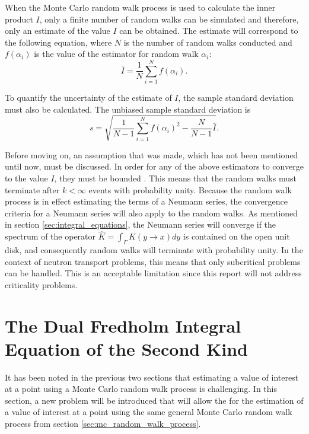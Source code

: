 When the Monte Carlo random walk process is used to calculate the inner product
$I$, only a finite number of random walks can be simulated and therefore, only 
an estimate of the value $I$ can be obtained. The estimate will
correspond to the following equation, where $N$ is the number of random walks
conducted and $f(\alpha_i)$ is the value of the estimator for random
walk $\alpha_i$:
\begin{equation}
  \bar{I} = \frac{1}{N} \sum_{i=1}^N f(\alpha_i).
  \label{eq:inner_product_estimate}
\end{equation}

To quantify the uncertainty of the estimate of $I$, the sample standard 
deviation must also be calculated. The unbiased sample standard deviation is 
\begin{equation}
  s = \sqrt{\frac{1}{N-1}\sum_{i=1}^N f(\alpha_i)^2 - \frac{N}{N-1}\bar{I}}.
  \label{eq:inner_product_stddev}
\end{equation}

Before moving on, an assumption that was made, which has not been mentioned
until now, must be discussed. In order for any of the above estimators to 
converge to the value $I$, they must be bounded \citep{spanier_monte_1969}. This
means that the random walks must terminate after $k < \infty$ events with 
probability unity. Because the random walk process is in effect estimating the
terms of a Neumann series, the convergence criteria for a Neumann series will
also apply to the random walks. As mentioned in section 
\ref{sec:integral_equations}, the Neumann series will converge if the spectrum
of the operator $\hat{K} = \int_{\Gamma} K(y \to x)dy$ is contained on the open
unit disk, and consequently random walks will terminate with probability unity.
In the context of neutron transport problems, this means that only subcritical 
problems can be handled. This is an acceptable limitation since this report 
will not address criticality problems.

\section{The Dual Fredholm Integral Equation of the Second Kind}
\label{sec:dual_problems}
It has been noted in the previous two sections that estimating a value of 
interest at a point using a Monte Carlo random walk process is challenging.
In this section, a new problem will be introduced that will allow the 
for the estimation of a value of interest at a point using the same general
Monte Carlo random walk process from section \ref{sec:mc_random_walk_process}. 

